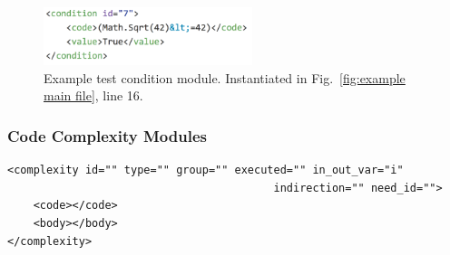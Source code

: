 \documentclass[12pt]{article}
\begin{document}
\begin{figure}[htbp]
  \includegraphics[width=2.4in]{fig_Complexity_file_test.png}
  \caption{Example test condition module.  Instantiated in
    Fig.~\ref{fig:example main file}, line 16.}
  \label{fig:example complexity-test file}
\end{figure}


\subsubsection{Code Complexity Modules}
\label{sec: complexity modules}

\begin{verbatim}
<complexity id="" type="" group="" executed="" in_out_var="i" 
                                         indirection="" need_id="">
    <code></code>
    <body></body>
</complexity>
\end{verbatim}
\end{document}
